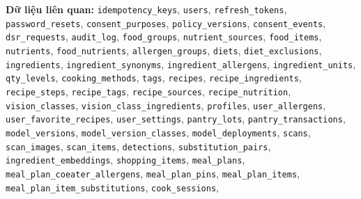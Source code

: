 \textbf{Dữ liệu liên quan:} {\small\texttt{idempotency\_\allowbreak{}\allowbreak{}keys}}, {\small\texttt{users}}, {\small\texttt{refresh\_\allowbreak{}\allowbreak{}tokens}}, {\small\texttt{password\_\allowbreak{}\allowbreak{}resets}}, {\small\texttt{consent\_\allowbreak{}\allowbreak{}purposes}}, {\small\texttt{policy\_\allowbreak{}\allowbreak{}versions}}, {\small\texttt{consent\_\allowbreak{}\allowbreak{}events}}, {\small\texttt{dsr\_\allowbreak{}\allowbreak{}requests}}, {\small\texttt{audit\_\allowbreak{}\allowbreak{}log}}, {\small\texttt{food\_\allowbreak{}\allowbreak{}groups}}, {\small\texttt{nutrient\_\allowbreak{}\allowbreak{}sources}}, {\small\texttt{food\_\allowbreak{}\allowbreak{}items}}, {\small\texttt{nutrients}}, {\small\texttt{food\_\allowbreak{}\allowbreak{}nutrients}}, {\small\texttt{allergen\_\allowbreak{}\allowbreak{}groups}}, {\small\texttt{diets}}, {\small\texttt{diet\_\allowbreak{}\allowbreak{}exclusions}}, {\small\texttt{ingredients}}, {\small\texttt{ingredient\_\allowbreak{}\allowbreak{}synonyms}}, {\small\texttt{ingredient\_\allowbreak{}\allowbreak{}allergens}}, {\small\texttt{ingredient\_\allowbreak{}\allowbreak{}units}}, {\small\texttt{qty\_\allowbreak{}\allowbreak{}levels}}, {\small\texttt{cooking\_\allowbreak{}\allowbreak{}methods}}, {\small\texttt{tags}}, {\small\texttt{recipes}}, {\small\texttt{recipe\_\allowbreak{}\allowbreak{}ingredients}}, {\small\texttt{recipe\_\allowbreak{}\allowbreak{}steps}}, {\small\texttt{recipe\_\allowbreak{}\allowbreak{}tags}}, {\small\texttt{recipe\_\allowbreak{}\allowbreak{}sources}}, {\small\texttt{recipe\_\allowbreak{}\allowbreak{}nutrition}}, {\small\texttt{vision\_\allowbreak{}\allowbreak{}classes}}, {\small\texttt{vision\_\allowbreak{}\allowbreak{}class\_\allowbreak{}\allowbreak{}ingredients}}, {\small\texttt{profiles}}, {\small\texttt{user\_\allowbreak{}\allowbreak{}allergens}}, {\small\texttt{user\_\allowbreak{}\allowbreak{}favorite\_\allowbreak{}\allowbreak{}recipes}}, {\small\texttt{user\_\allowbreak{}\allowbreak{}settings}}, {\small\texttt{pantry\_\allowbreak{}\allowbreak{}lots}}, {\small\texttt{pantry\_\allowbreak{}\allowbreak{}transactions}}, {\small\texttt{model\_\allowbreak{}\allowbreak{}versions}}, {\small\texttt{model\_\allowbreak{}\allowbreak{}version\_\allowbreak{}\allowbreak{}classes}}, {\small\texttt{model\_\allowbreak{}\allowbreak{}deployments}}, {\small\texttt{scans}}, {\small\texttt{scan\_\allowbreak{}\allowbreak{}images}}, {\small\texttt{scan\_\allowbreak{}\allowbreak{}items}}, {\small\texttt{detections}}, {\small\texttt{substitution\_\allowbreak{}\allowbreak{}pairs}}, {\small\texttt{ingredient\_\allowbreak{}\allowbreak{}embeddings}}, {\small\texttt{shopping\_\allowbreak{}\allowbreak{}items}}, {\small\texttt{meal\_\allowbreak{}\allowbreak{}plans}}, {\small\texttt{meal\_\allowbreak{}\allowbreak{}plan\_\allowbreak{}\allowbreak{}coeater\_\allowbreak{}\allowbreak{}allergens}}, {\small\texttt{meal\_\allowbreak{}\allowbreak{}plan\_\allowbreak{}\allowbreak{}pins}}, {\small\texttt{meal\_\allowbreak{}\allowbreak{}plan\_\allowbreak{}\allowbreak{}items}}, {\small\texttt{meal\_\allowbreak{}\allowbreak{}plan\_\allowbreak{}\allowbreak{}item\_\allowbreak{}\allowbreak{}substitutions}}, {\small\texttt{cook\_\allowbreak{}\allowbreak{}sessions}}, 